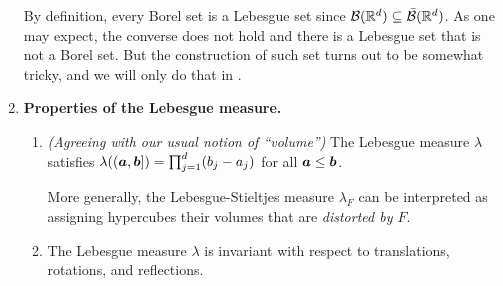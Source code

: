\begin{enumerate}
By definition, every Borel set is a Lebesgue set since
\(\mathcal{B}(\mathbb{R}^d)\subseteq \bar{\mathcal{B}}(\mathbb{R}^d)\). As one may expect, the
converse does not hold and there is a Lebesgue set that is not a Borel set.
But the construction of such set turns out to be somewhat tricky, and we will
only do that in .

\item \label{it:lebesgue-meas-prop} \textbf{Properties of the Lebesgue measure.}
\begin{enumerate}
\item \emph{(Agreeing with our usual notion of ``volume'')} The Lebesgue
measure \(\lambda\) satisfies
\(\lambda((\bm{a},\bm{b}])=\prod_{j=1}^{d}(b_j-a_j)\) for all
\(\bm{a}\le\bm{b}\).
\begin{note}
More generally, the Lebesgue-Stieltjes measure \(\lambda_{F}\) can be
interpreted as assigning hypercubes their volumes that are \emph{distorted by \(F\)}.
\end{note}

\item The Lebesgue measure \(\lambda\) is invariant with respect to
translations, rotations, and reflections.


\end{enumerate}
\end{enumerate}
